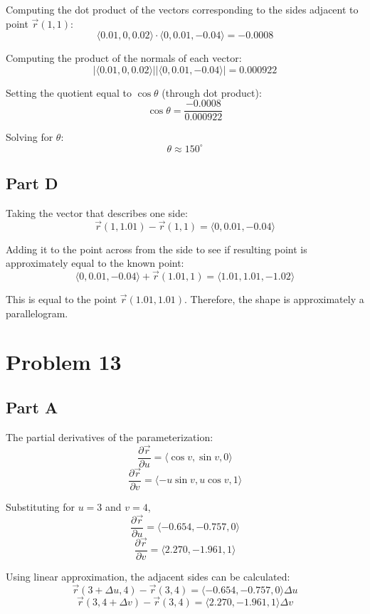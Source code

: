 \documentclass{article}
\begin{document}
Computing the dot product of the vectors corresponding to the sides adjacent to
point $\vec{r}(1,1)$:
$$ \langle 0.01, 0, 0.02 \rangle \cdot \langle 0, 0.01, -0.04 \rangle = -0.0008
$$

Computing the product of the normals of each vector:
$$ \vert \langle 0.01, 0, 0.02 \rangle \vert \vert \langle 0, 0.01, -0.04
\rangle \vert = 0.000922 $$

Setting the quotient equal to $\cos \theta$ (through dot product):
$$ \cos \theta = \frac{ -0.0008 }{ 0.000922 } $$

Solving for $\theta$:
$$ \theta \approx 150^\circ $$

\subsection*{Part D}

Taking the vector that describes one side:
$$ \vec{r}(1, 1.01) - \vec{r}(1,1) = \langle 0, 0.01, -0.04 \rangle $$

Adding it to the point across from the side to see if resulting point is
approximately equal to the known point:
$$ \langle 0, 0.01, -0.04 \rangle + \vec{r}(1.01, 1) = \langle 1.01, 1.01, -1.02
\rangle $$

This is equal to the point $\vec{r}(1.01, 1.01)$. Therefore, the shape is
approximately a parallelogram. 

\section*{Problem 13}

\subsection*{Part A}

The partial derivatives of the parameterization:
$$ \frac{\partial \vec{r}}{\partial u} = \langle \cos v, \sin v, 0 \rangle $$
$$ \frac{\partial \vec{r}}{\partial v} = \langle - u \sin v, u \cos v, 1 \rangle
$$

Substituting for $u = 3$ and $v = 4$,
$$ \frac{\partial \vec{r}}{\partial u} = \langle -0.654, -0.757, 0 \rangle $$
$$ \frac{\partial \vec{r}}{\partial v} = \langle 2.270, -1.961, 1 \rangle $$

Using linear approximation, the adjacent sides can be calculated:
$$ \vec{r}(3 + \Delta u, 4) - \vec{r}(3, 4) =\langle -0.654, -0.757, 0
\rangle\Delta u $$
$$ \vec{r}(3, 4 + \Delta v) - \vec{r}(3, 4) =  \langle 2.270, -1.961, 1 \rangle
\Delta v $$
\end{document}
